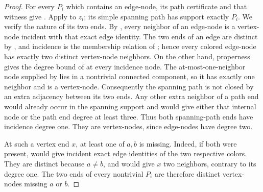 \begin{proof}
For every $P_i$ which contains an edge-node, its path certificate and
that witness give .  Apply
 to $z_i$; its simple spanning path
has support exactly $P_i$.  We verify the nature of its two ends.  By
, every neighbor of an edge-node is a
vertex-node incident with that exact edge identity.  The two ends of an
edge are distinct by , and incidence is the
membership relation of ; hence every colored edge-node
has exactly two distinct vertex-node neighbors.  On the other hand,
properness gives the degree bound of
 at every incidence node.  The
at-most-one-neighbor node supplied by
 lies in a nontrivial connected component,
so it has exactly one neighbor and is a vertex-node.  Consequently the
spanning path is not closed by an extra adjacency between its two ends.
Any other extra neighbor of a path end would already occur in the spanning
support and would give either that internal node or the path end degree at
least three.  Thus both spanning-path ends have incidence degree one.  They
are vertex-nodes, since edge-nodes have degree two.

At such a vertex end $x$, at least one of $a,b$ is missing.  Indeed, if
both were present,  would give incident exact edge
identities of the two respective colors.  They are distinct because
$a\ne b$, and  would give $x$ two
neighbors, contrary to its degree one.  The two ends of every nontrivial
$P_i$ are therefore distinct vertex-nodes missing $a$ or $b$.


\end{proof}
